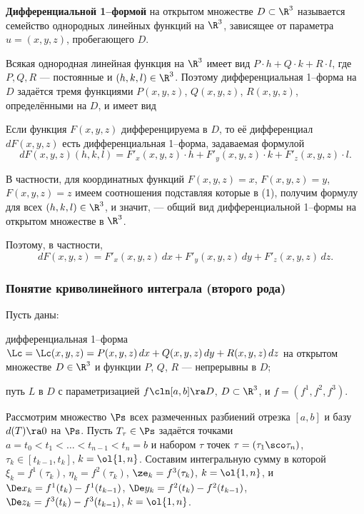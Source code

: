 \documentclass[a4paper]{article}
\begin{document}
\textbf{Дифференциальной 1--формой} на открытом множестве
$D\subset\R^3$ называется семейство однородных линейных функций на
$\R^3$, зависящее от параметра $u=(x,y,z)$, пробегающего $D$.

Всякая однородная линейная функция на $\R^3$ имеет вид $P\cdot h +
Q\cdot k + R\cdot l$, где $P,Q,R$ --- постоянные и $(h,k,l)\in\R^3$.
Поэтому дифференциальная 1--форма на $D$ задаётся тремя функциями
$P(x,y,z)$, $Q(x,y,z)$, $R(x,y,z)$, определёнными на $D$, и имеет
вид 

Если функция $F(x,y,z)$ дифференцируема в $D$, то её дифференциал
$dF(x,y,z)$ есть дифференциальная 1--форма, задаваемая формулой
$$dF(x,y,z)(h,k,l) = F'_x(x,y,z)\cdot h + F'_y(x,y,z)\cdot k +
F'_z(x,y,z)\cdot l.$$

В частности, для координатных функций $F(x,y,z)=x$, $F(x,y,z)=y$,
$F(x,y,z)=z$ имеем соотношения  подставляя которые в (1), получим формулу
 для всех $(h,k,l)\in\R^3$, и значит,
 ---
общий вид дифференциальной 1--формы на открытом множестве в $\R^3$.

Поэтому, в частности,
$$dF(x,y,z)=F'_x(x,y,z)\,dx+F'_y(x,y,z)\,dy+F'_z(x,y,z)\,dz.$$

\subsubsection{Понятие криволинейного интеграла (второго рода)}

Пусть даны:

\begin{nums}{-2}
\item дифференциальная 1--форма $\Lc=\Lc(x,y,z)=P(x,y,z)\,dx +
Q(x,y,z)\,dy + R(x,y,z)\,dz$ на открытом множестве $D\in\R^3$ и
функции $P$, $Q$, $R$ --- непрерывны в $D$;

\item путь $L$ в $D$ с параметризацией $f\cln [a,b]\ra D$,
$D\subset\R^3$, и $f=(f^1,f^2,f^3)$.
\end{nums}

Рассмотрим множество $\Ps$ всех размеченных разбиений отрезка
$[a,b]$ и базу $d(T)\ra0$ на $\Ps$. Пусть $T_{\tau}\in\Ps$ задаётся
точками $a=t_0<t_1<\ldots<t_{n-1}<t_n=b$ и набором $\tau$ точек
$\tau=(\tau_1\sco \tau_n)$, $\tau_k\in[t_{k-1},t_k]$, $k=\ol{1,n}$.
Составим интегральную сумму  в которой $\xi_k=f^1(\tau_k)$,
$\eta_k=f^2(\tau_k)$, $\ze_k=f^3(\tau_k)$, $k=\ol{1,n}$, и $\De x_k
= f^1(t_k)-f^1(t_{k-1})$, $\De y_k = f^2(t_k) - f^2(t_{k-1})$, $\De
z_k = f^3(t_k) - f^3(t_{k-1})$, $k=\ol{1,n}$.
\end{document}
